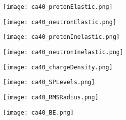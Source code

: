 \documentclass[twocolumn,secnumarabic,amssymb, nobibnotes, aps, prl,
superscriptaddress, nobalancelastpage, floatfix]{revtex4}
\newcommand{\caForty}{\ensuremath{^{40}}C\lowercase{a}}
\begin{document}
{\begin{figure*}[!htb]
    \centering
    \begin{minipage}{0.4\linewidth}
        \centering
        \texttt{[image: ca40\_protonElastic.png]}
        \label{DOM_ca40_proton_elastic}
    \end{minipage}\hspace{6pt}
    \begin{minipage}{0.4\linewidth}
        \centering
        \texttt{[image: ca40\_neutronElastic.png]}
        \label{DOM_ca40_neutron_elastic}
    \end{minipage}
    \centering
    \begin{minipage}{0.4\linewidth}
        \centering
        \texttt{[image: ca40\_protonInelastic.png]}
        \label{DOM_ca40_proton_inelastic}
    \end{minipage}\hspace{6pt}
    \begin{minipage}{0.4\linewidth}
        \centering
        \texttt{[image: ca40\_neutronInelastic.png]}
        \label{DOM_ca40_neutron_inelastic}
    \end{minipage}
    \centering
    \begin{minipage}{0.4\linewidth}
        \centering
        \texttt{[image: ca40\_chargeDensity.png]}
        \label{DOM_ca40_chargeDensity}
    \end{minipage}\hspace{6pt}
    \begin{minipage}{0.4\linewidth}
        \centering
        \texttt{[image: ca40\_SPLevels.png]}
        \label{DOM_ca40_SPLevels}
    \end{minipage}
    \begin{minipage}{0.4\linewidth}
        \centering
        \texttt{[image: ca40\_RMSRadius.png]}
        \label{DOM_ca40_RMSRadius}
    \end{minipage}\hspace{6pt}
    \begin{minipage}{0.4\linewidth}
        \centering
        \texttt{[image: ca40\_BE.png]}
        \label{DOM_ca40_BE}
    \end{minipage}
    \caption{\caForty: constraining experimental data and DOM fit. See introduction of
    Appendix C for description.}
    \label{DOM_ca40}
\end{figure*}

}
\end{document}

